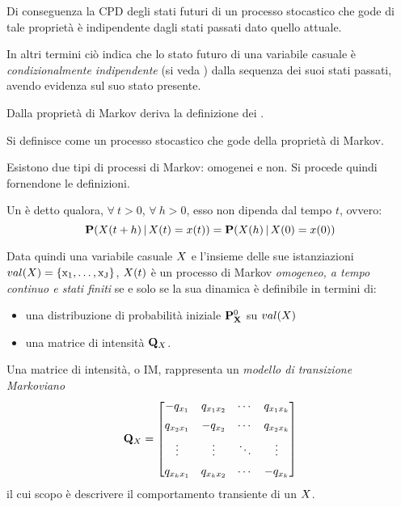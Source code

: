 Di conseguenza la \acl{CPD} degli stati futuri di un processo stocastico che gode di tale proprietà è indipendente dagli stati passati dato quello attuale.

In altri termini ciò indica che lo stato futuro di una variabile casuale è \emph{condizionalmente indipendente} (si veda ) dalla sequenza dei suoi stati passati, avendo evidenza sul suo stato presente.

Dalla proprietà di Markov deriva la definizione dei \mprocess{}.

\begin{definizione}[\upcase\mprocess*{}]
Si definisce come \mprocess*{} un processo stocastico che gode della proprietà di Markov.
\end{definizione}

Esistono due tipi di processi di Markov: omogenei e non. Si procede quindi fornendone le definizioni.

\begin{definizione}[\upcase\mprocess*{} \omog*{}]
\label{defn:homogeneus-markov-process}
Un \mprocess*{} è detto \emph{\omog*{}} qualora, $\forall\:t>0$, $\forall\:h>0$, esso non dipenda dal tempo $t$, ovvero:
\begin{equation}
\label{eq:homogeneus-markov-process}
\mathbf{P}(\mathnormal{X}(t + h)\,\arrowvert\,\mathnormal{X}(t)=x(t))=\mathbf{P}(\mathnormal{X}(h)\,\arrowvert\,\mathnormal{X}(0)=x(0))
\end{equation}
\end{definizione}
Data quindi una variabile casuale $\mathnormal{X}$ e l'insieme delle sue istanziazioni $val(\mathnormal{X})=\{ \mathrm{x_1}, \dotsc, \mathrm{x_J} \}$, $\mathnormal{X}(t)$ è un processo di Markov \emph{omogeneo, a tempo continuo e stati finiti} se e solo se la sua dinamica è definibile in termini di:
\begin{itemize}
    \item una distribuzione di probabilità iniziale $\mathbf{P}^0_{\mathbf{X}}$ su $val(\mathnormal{X})$
    \item una matrice di intensità $\mathbf{Q}_{\mathnormal{X}}$.
\end{itemize}

\begin{definizione}
\label{defn:im}
Una matrice di intensità, o \acf{IM}, rappresenta un \emph{modello di transizione Markoviano}
\[
\mathbf{Q}_{\mathnormal{X}}= \begin{bmatrix}
                        -q_{x_1}    & q_{x_1x_2}& \cdots & q_{x_1x_k}   \\[0.5em]
                        q_{x_2x_1}  & -q_{x_2}  & \cdots & q_{x_2x_k}   \\[0.5em]
                        \vdots      & \vdots    & \ddots & \vdots       \\[0.5em]
                        q_{x_kx_1}  & q_{x_kx_2}& \cdots & -q_{x_k}
                    \end{bmatrix}
\]
il cui scopo è descrivere il comportamento transiente di un \mprocess*{} \omog*{} $\mathnormal{X}$.
\end{definizione}

